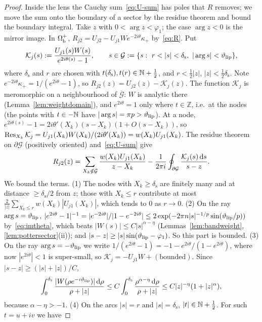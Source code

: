 \begin{proof}
Inside the lens the Cauchy sum~\eqref{eq:U-sum} has poles that $R$ removes; we move the sum onto the boundary of a
sector by the residue theorem and bound the boundary integral. Take $z$ with $0<\arg z<\varphi_1$; the case $\arg z<0$ is the mirror image. In $\Omega_{\mathrm{b}}^+$, $R_{j2}=U_{j2}-U_{j1}We^{-2i\theta}\kappa_+$
by~\eqref{eq:R}. Put
\[
  \mathcal K_j(s):=\frac{U_{j1}(s)W(s)}{e^{2i\theta(s)}-1},\qquad s\in\mathcal G:=\{s:\ r<|s|<\delta_{\mathrm s},\ |\arg s|<\thlip\},
\]
where $\delta_{\mathrm s}$ and $r$ are chosen with $t(\delta_{\mathrm s}),t(r)\in\mathbb{N}+\frac12$, and $r<\frac12|z|$, $|z|<\frac12\delta_{\mathrm s}$. Note $e^{-2i\theta}\kappa_+=1/(e^{2i\theta}-1)$,
so $R_{j2}(z)=U_{j2}(z)-\mathcal K_j(z)$. The function $\mathcal K_j$ is meromorphic on a neighbourhood of $\overline{\mathcal G}$: $W$ is
analytic there (Lemma~\ref{lem:weightdomain}), and $e^{2i\theta}=1$ only where $t\in\mathbb Z$, i.e.\ at the nodes (the points with
$t\in-\mathbb{N}$ have $|\arg s|=\pi p>\vartheta_{\mathrm{lip}}$). At a node, $e^{2i\theta(s)}-1=2i\theta'(X_k)(s-X_k)(1+O(s-X_k))$, so
$\operatorname*{Res}_{X_k}\mathcal K_j=U_{j1}(X_k)W(X_k)/(2i\theta'(X_k))=w(X_k)U_{j1}(X_k)$. The residue theorem on $\partial\mathcal G$ (positively
oriented) and~\eqref{eq:U-sum} give
\begin{equation}\label{eq:R-contour}
  R_{j2}(z)=\sum_{X_k\notin\mathcal G}\frac{w(X_k)U_{j1}(X_k)}{z-X_k}-\frac1{2\pi i}\oint_{\partial\mathcal G}\frac{\mathcal K_j(s)\,\mathrm{d} s}{s-z}.
\end{equation}
We bound the terms. (1) The nodes with $X_k\ge\delta_{\mathrm s}$ are finitely many and at distance $\ge\delta_{\mathrm s}/2$ from $z$; those with $X_k\le r$
contribute at most $\frac2{|z|}\sum_{X_k\le r}w(X_k)|U_{j1}(X_k)|$, which tends to $0$ as $r\to0$. (2) On the ray
$\arg s=\vartheta_{\mathrm{lip}}$, $|e^{2i\theta}-1|^{-1}=|e^{-2i\theta}|/|1-e^{-2i\theta}|\le2\exp(-2\pi n|s|^{-1/p}\sin(\vartheta_{\mathrm{lip}}/p))$ by~\eqref{eq:imtheta},
which beats $|W(s)|\le C|s|^{\alpha-\eta}$ (Lemmas~\ref{lem:bandweight}, \ref{lem:pottersector}(ii)); and $|s-z|\ge|s|\sin(\vartheta_{\mathrm{lip}}-\varphi_1)$.
So this part is bounded. (3) On the ray $\arg s=-\vartheta_{\mathrm{lip}}$ we write $1/(e^{2i\theta}-1)=-1-e^{2i\theta}/(1-e^{2i\theta})$, where now
$|e^{2i\theta}|<1$ is super-small, so $\mathcal K_j=-U_{j1}W+(\text{bounded})$. Since $|s-z|\ge(|s|+|z|)/C$,
\[
  \int_0^{\delta_{\mathrm s}}\frac{|W(\rho e^{-i\vartheta_{\mathrm{lip}}})|\,\mathrm{d}\rho}{\rho+|z|}\le C\int_0^{\delta_{\mathrm s}}\frac{\rho^{\alpha-\eta}\,\mathrm{d}\rho}{\rho+|z|}\le C|z|^{-\eta}(1+|z|^{\alpha}),
\]
because $\alpha-\eta>-1$. (4) On the arcs $|s|=r$ and $|s|=\delta_{\mathrm s}$, $|t|\in\mathbb{N}+\frac12$. For such $t=u+iv$ we have

\end{proof}
